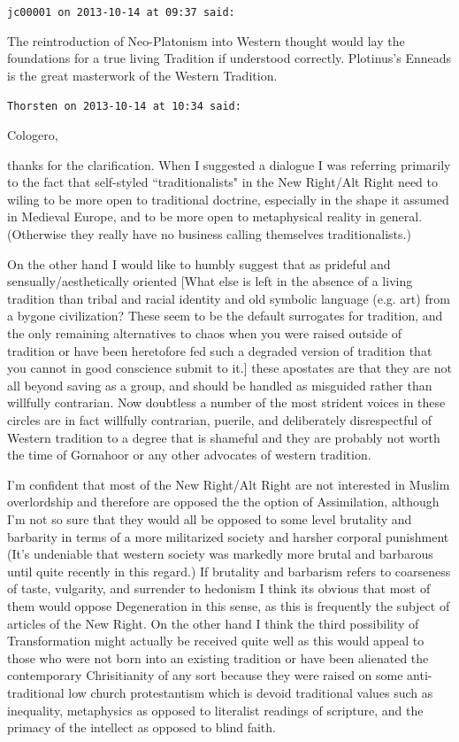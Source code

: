 \begin{footnotesize}\begin{sffamily}



\texttt{jc00001 on 2013-10-14 at 09:37 said: }

The reintroduction of Neo-Platonism into Western thought would lay the foundations for a true living Tradition if
understood correctly. Plotinus's Enneads is the great masterwork of the Western Tradition.


\hfill

\texttt{Thorsten on 2013-10-14 at 10:34 said: }

Cologero,

thanks for the clarification. When I suggested a dialogue I was referring primarily to the fact that self-styled
``traditionalists" in the New Right/Alt Right need to wiling to be more open to traditional doctrine, especially in the
shape it assumed in Medieval Europe, and to be more open to metaphysical reality in general. (Otherwise they really
have no business calling themselves traditionalists.)

On the other hand I would like to humbly suggest that as prideful and sensually/aesthetically oriented [What else is
left in the absence of a living tradition than tribal and racial identity and old symbolic language (e.g. art) from a
bygone civilization? These seem to be the default surrogates for tradition, and the only remaining alternatives to
chaos when you were raised outside of tradition or have been heretofore fed such a degraded version of tradition that
you cannot in good conscience submit to it.] these apostates are that they are not all beyond saving as a group, and
should be handled as misguided rather than willfully contrarian. Now doubtless a number of the most strident voices in
these circles are in fact willfully contrarian, puerile, and deliberately disrespectful of Western tradition to a
degree that is shameful and they are probably not worth the time of Gornahoor or any other advocates of western
tradition.

I'm confident that most of the New Right/Alt Right are not interested in Muslim overlordship and
therefore are opposed the the option of Assimilation, although I'm not so sure that they would all
be opposed to some level brutality and barbarity in terms of a more militarized society and harsher corporal punishment
(It's undeniable that western society was markedly more brutal and barbarous until quite recently
in this regard.) If brutality and barbarism refers to coarseness of taste, vulgarity, and surrender to hedonism I think
its obvious that most of them would oppose Degeneration in this sense, as this is frequently the subject of articles of
the New Right. On the other hand I think the third possibility of Transformation might actually be received quite well
as this would appeal to those who were not born into an existing tradition or have been alienated the contemporary
Chrisitianity of any sort because they were raised on some anti-traditional low church protestantism which is devoid
traditional values such as inequality, metaphysics as opposed to literalist readings of scripture, and the primacy of
the intellect as opposed to blind faith.


\end{sffamily}
\end{footnotesize}
